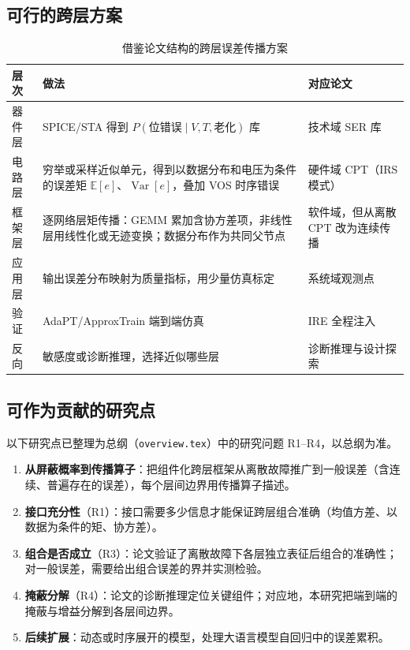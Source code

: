 \documentclass[11pt,a4paper]{ctexart}
\begin{document}
\subsection{可行的跨层方案}
\begin{table}[h]
\centering
\small
\begin{tabularx}{\textwidth}{@{}lXX@{}}
\toprule
层次 & 做法 & 对应论文 \\
\midrule
器件层 & SPICE/STA 得到 $P(\text{位错误}\mid V, T, \text{老化})$ 库 & 技术域 SER 库 \\
电路层 & 穷举或采样近似单元，得到以数据分布和电压为条件的误差矩 $\mathbb{E}[e]$、$\operatorname{Var}[e]$，叠加 VOS 时序错误 & 硬件域 CPT（IRS 模式） \\
框架层 & 逐网络层矩传播：GEMM 累加含协方差项，非线性层用线性化或无迹变换；数据分布作为共同父节点 & 软件域，但从离散 CPT 改为连续传播 \\
应用层 & 输出误差分布映射为质量指标，用少量仿真标定 & 系统域观测点 \\
验证 & AdaPT/ApproxTrain 端到端仿真 & IRE 全程注入 \\
反向 & 敏感度或诊断推理，选择近似哪些层 & 诊断推理与设计探索 \\
\bottomrule
\end{tabularx}
\caption{借鉴论文结构的跨层误差传播方案}
\end{table}

\subsection{可作为贡献的研究点}
以下研究点已整理为总纲（\texttt{overview.tex}）中的研究问题 R1--R4，以总纲为准。
\begin{enumerate}[leftmargin=*]
  \item \textbf{从屏蔽概率到传播算子}：把组件化跨层框架从离散故障推广到一般误差（含连续、普遍存在的误差），每个层间边界用传播算子描述。
  \item \textbf{接口充分性}（R1）：接口需要多少信息才能保证跨层组合准确（均值方差、以数据为条件的矩、协方差）。
  \item \textbf{组合是否成立}（R3）：论文验证了离散故障下各层独立表征后组合的准确性；对一般误差，需要给出组合误差的界并实测检验。
  \item \textbf{掩蔽分解}（R4）：论文的诊断推理定位关键组件；对应地，本研究把端到端的掩蔽与增益分解到各层间边界。
  \item \textbf{后续扩展}：动态或时序展开的模型，处理大语言模型自回归中的误差累积。
\end{enumerate}
\end{document}
